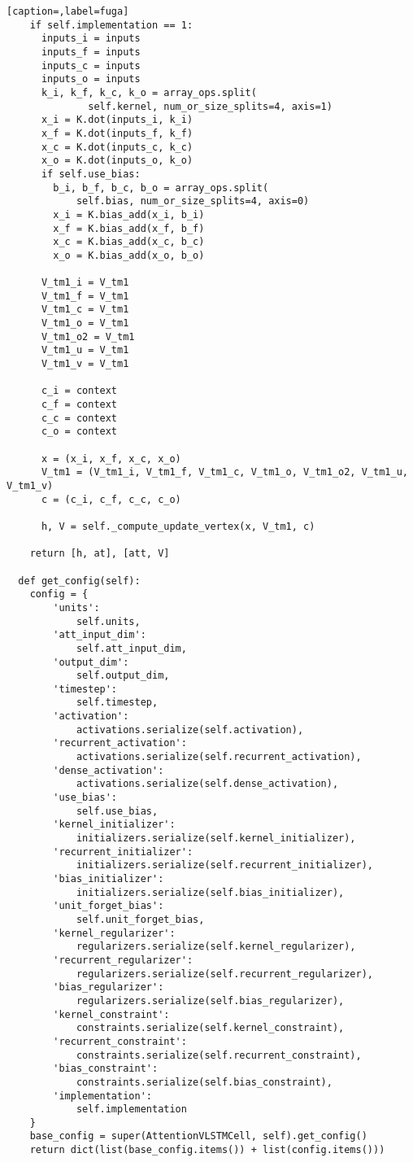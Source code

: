 \begin{lstlisting}[caption=,label=fuga]
    if self.implementation == 1:
      inputs_i = inputs
      inputs_f = inputs
      inputs_c = inputs
      inputs_o = inputs
      k_i, k_f, k_c, k_o = array_ops.split(
              self.kernel, num_or_size_splits=4, axis=1)
      x_i = K.dot(inputs_i, k_i)
      x_f = K.dot(inputs_f, k_f)
      x_c = K.dot(inputs_c, k_c)
      x_o = K.dot(inputs_o, k_o)
      if self.use_bias:
        b_i, b_f, b_c, b_o = array_ops.split(
            self.bias, num_or_size_splits=4, axis=0)
        x_i = K.bias_add(x_i, b_i)
        x_f = K.bias_add(x_f, b_f)
        x_c = K.bias_add(x_c, b_c)
        x_o = K.bias_add(x_o, b_o)

      V_tm1_i = V_tm1
      V_tm1_f = V_tm1
      V_tm1_c = V_tm1
      V_tm1_o = V_tm1
      V_tm1_o2 = V_tm1
      V_tm1_u = V_tm1
      V_tm1_v = V_tm1

      c_i = context
      c_f = context
      c_c = context
      c_o = context

      x = (x_i, x_f, x_c, x_o)
      V_tm1 = (V_tm1_i, V_tm1_f, V_tm1_c, V_tm1_o, V_tm1_o2, V_tm1_u, V_tm1_v)
      c = (c_i, c_f, c_c, c_o)

      h, V = self._compute_update_vertex(x, V_tm1, c)

    return [h, at], [att, V]

  def get_config(self):
    config = {
        'units':
            self.units,
        'att_input_dim':
            self.att_input_dim,
        'output_dim':
            self.output_dim,
        'timestep':
            self.timestep,
        'activation':
            activations.serialize(self.activation),
        'recurrent_activation':
            activations.serialize(self.recurrent_activation),
        'dense_activation':
            activations.serialize(self.dense_activation),
        'use_bias':
            self.use_bias,
        'kernel_initializer':
            initializers.serialize(self.kernel_initializer),
        'recurrent_initializer':
            initializers.serialize(self.recurrent_initializer),
        'bias_initializer':
            initializers.serialize(self.bias_initializer),
        'unit_forget_bias':
            self.unit_forget_bias,
        'kernel_regularizer':
            regularizers.serialize(self.kernel_regularizer),
        'recurrent_regularizer':
            regularizers.serialize(self.recurrent_regularizer),
        'bias_regularizer':
            regularizers.serialize(self.bias_regularizer),
        'kernel_constraint':
            constraints.serialize(self.kernel_constraint),
        'recurrent_constraint':
            constraints.serialize(self.recurrent_constraint),
        'bias_constraint':
            constraints.serialize(self.bias_constraint),
        'implementation':
            self.implementation
    }
    base_config = super(AttentionVLSTMCell, self).get_config()
    return dict(list(base_config.items()) + list(config.items()))
\end{lstlisting}

